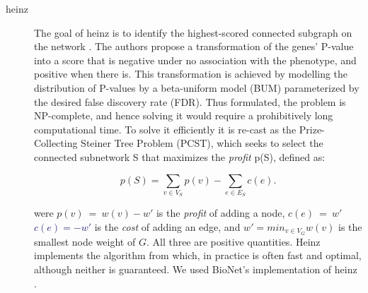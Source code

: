 \documentclass[twocolumn, 11pt]{article}
\newcommand{\caz}[2]{{\sout{#1}}\unskip\space\textcolor{MidnightBlue}{#2}}
\begin{document}
\begin{description}
\item[{heinz}] The goal of heinz is to identify the highest-scored connected subgraph on the network \cite{dittrich_identifying_2008}. The authors propose a transformation of the genes' P-value into a score that is negative under no association with the phenotype, and positive when there is. This transformation is achieved by modelling the distribution of P-values by a beta-uniform model (BUM) parameterized by the desired false discovery rate (FDR). Thus formulated, the problem is NP-complete, and hence solving it would require a prohibitively long computational time. To solve it efficiently it is re-cast as the Prize-Collecting Steiner Tree Problem (PCST), which seeks to select the connected subnetwork S that maximizes the \emph{profit} p(S), defined as:

\begin{equation*}
p(S) = \sum_{v \in V_S} p(v) - \sum_{e \in E_S} c(e). 
\end{equation*}

were $p(v)~=~w(v) - w'$ is the \emph{profit} of adding a node, \caz{$c(e)~=~w'$}{$c(e)=-w'$} is the \emph{cost} of adding an edge, and $w' = min_{v \in V_{G}} w(v)$ is the smallest node weight of $G$. All three are positive quantities. Heinz implements the algorithm from \citet{ljubic_algorithmic_2006} which, in practice is often fast and optimal, although neither is guaranteed. We used BioNet's implementation of heinz \cite{beisser_bionet:_2010,heinz}.


\end{description}
\end{document}
